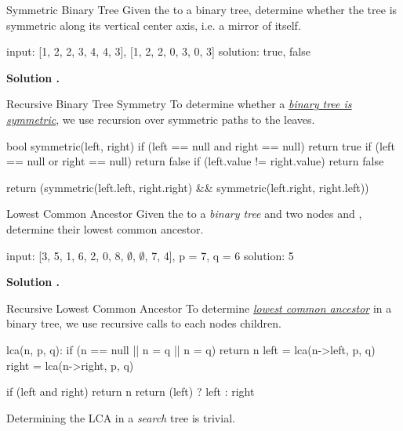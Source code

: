 \documentclass{cognito}
\begin{document}
\begin{note}{Symmetric Binary Tree}
	Given the  to a binary tree, determine whether the tree is symmetric along
	its vertical center axis, i.e. a mirror of itself.
	
	\begin{largecode}
 input: [1, 2, 2, 3, 4, 4, 3], [1, 2, 2, 0, 3, 0, 3]
 solution: true, false
	\end{largecode}
	\bf Solution \hyperref[note:Recursive Binary Tree Symmetry]{\solutionref}.
\end{note}

\begin{note}{Recursive Binary Tree Symmetry}
	To determine whether a \hyperref[note:Symmetric Binary Tree]{\it binary tree is symmetric}, we use
	recursion over symmetric paths to the leaves.
	
	\begin{largecode}
 bool symmetric(left, right)
 	if (left == null and right == null) return true
	if (left == null or right == null) return false
	if (left.value != right.value) return false
	
	return (symmetric(left.left, right.right) &&
		    symmetric(left.right, right.left))
	\end{largecode}
	\vspace{-5pt}
\end{note}

\begin{note}{Lowest Common Ancestor}
	Given the  to a {\it binary tree} and two nodes  and ,
	determine their lowest common ancestor.

	\begin{largecode}
 input:  [3, 5, 1, 6, 2, 0, 8, $\emptyset$, $\emptyset$, 7, 4], p = 7, q = 6
 solution: 5
 	\end{largecode}
	\bf Solution \hyperref[note:Recursive Lowest Common Ancestor]{\solutionref}.
\end{note}

\begin{note}{Recursive Lowest Common Ancestor}
	To determine \hyperref[note:Lowest Common Ancestor]{\it lowest common ancestor} in a binary tree,
	we use recursive calls to each nodes children.
	
	\begin{largecode}
 lca(n, p, q):
	if (n == null || n = q || n = q) return n
	left  = lca(n->left, p, q)
	right = lca(n->right, p, q)
	
	if (left and right) return n
	return (left) ? left : right
	\end{largecode}
	\begin{remark} Determining the LCA in a {\it search} tree is trivial. \end{remark}
	\vspace{-5pt}
\end{note}
\end{document}
